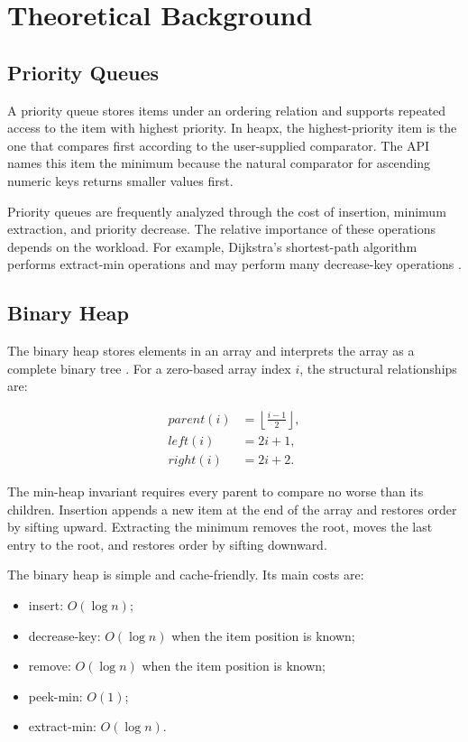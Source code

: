 \chapter{Theoretical Background}

\section{Priority Queues}

A priority queue stores items under an ordering relation and supports repeated access to the item with highest priority.
In heapx, the highest-priority item is the one that compares first according to the user-supplied comparator.
The API names this item the minimum because the natural comparator for ascending numeric keys returns smaller values first.

Priority queues are frequently analyzed through the cost of insertion, minimum extraction, and priority decrease.
The relative importance of these operations depends on the workload.
For example, Dijkstra's shortest-path algorithm performs extract-min operations and may perform many decrease-key operations \cite{dijkstra1959note}.

\section{Binary Heap}

The binary heap stores elements in an array and interprets the array as a complete binary tree \cite{cormen2009introduction}.
For a zero-based array index $i$, the structural relationships are:

\begin{align}
    parent(i) & = \left\lfloor \frac{i - 1}{2} \right\rfloor, \\
    left(i)   & = 2i + 1,                                     \\
    right(i)  & = 2i + 2.
\end{align}

The min-heap invariant requires every parent to compare no worse than its children.
Insertion appends a new item at the end of the array and restores order by sifting upward.
Extracting the minimum removes the root, moves the last entry to the root, and restores order by sifting downward.

The binary heap is simple and cache-friendly.
Its main costs are:

\begin{itemize}
    \item insert: $O(\log n)$;
    \item decrease-key: $O(\log n)$ when the item position is known;
    \item remove: $O(\log n)$ when the item position is known;
    \item peek-min: $O(1)$;
    \item extract-min: $O(\log n)$.
\end{itemize}

